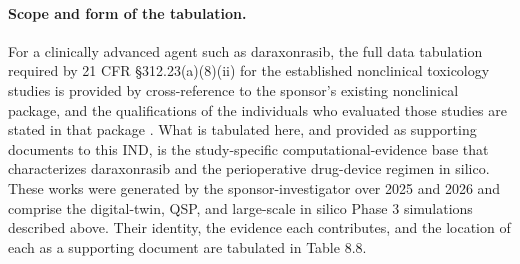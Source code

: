 \paragraph{Scope and form of the tabulation.}
For a clinically advanced agent such as daraxonrasib, the full data tabulation
required by 21 CFR \S 312.23(a)(8)(ii) for the established nonclinical
toxicology studies is provided by cross-reference to the sponsor's existing
nonclinical package, and the qualifications of the individuals who evaluated
those studies are stated in that package \cite{phase1guidance,daraxwhipple}.
What is tabulated here, and provided as supporting documents to this IND, is the
study-specific computational-evidence base that characterizes daraxonrasib and
the perioperative drug-device regimen in silico. These works were generated by
the sponsor-investigator over 2025 and 2026 and comprise the digital-twin, QSP,
and large-scale in silico Phase 3 simulations described above. Their identity,
the evidence each contributes, and the location of each as a supporting document
are tabulated in Table 8.8.


